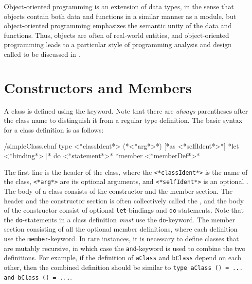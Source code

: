 Object-oriented programming is an extension of data types, in the sense that objects contain both data and functions in a similar manner as a module, but object-oriented programming emphasizes the semantic unity of the data and functions. Thus, objects are often  of real-world entities, and object-oriented programming leads to a particular style of programming analysis and design called  to be discussed in . 

\section{Constructors and Members}
\label{sec:constructor}
A class is defined using the  keyword. Note that there are \emph{always} parentheses after the class name to distinguish it from a regular type definition. The basic syntax for a class definition is as follows:%
%
\begin{verbatimwrite}{\ebnf/simpleClass.ebnf}
type <*classIdent*> ({*<*arg*>*}) [*as <*selfIdent*>*] 
  {*let <*binding*> |* do <*statement*>*}
  {*member <*memberDef*>*}
\end{verbatimwrite}
%
The first line is the header of the class, where the \lstinline[language=syntax]{<*classIdent*>} is the name of the class, \lstinline[language=syntax]{<*arg*>} are its optional arguments, and \lstinline[language=syntax]{<*selfIdent*>} is an optional . The body of a class consists of the constructor and the member section. The header and the constructor section is often collectively called the , and the body of the constructor consist of optional \lstinline{let}-bindings and \lstinline{do}-statements. Note that the \lstinline{do}-statements in a class definition \emph{must} use the \lstinline{do}-keyword. The member section consisting of all the optional member definitions, where each definition use the \lstinline{member}-keyword. In rare instances, it is necessary to define classes that are mutably recursive, in which case the \lstinline{and}-keyword is used to combine the two definitions. For example, if the definition of \lstinline{aClass} and \lstinline{bClass} depend on each other, then the combined definition should be similar to \lstinline{type aClass () = ... and bClass () = ...}.


